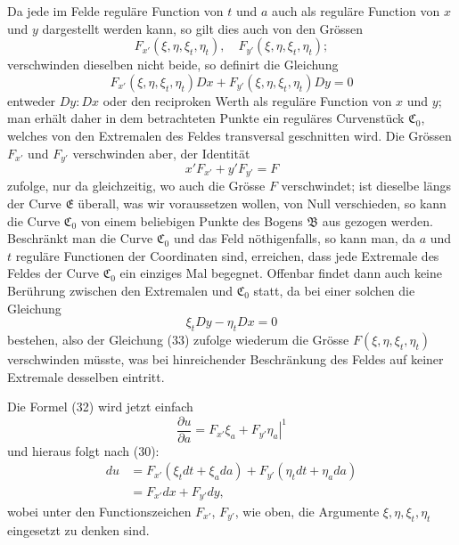 \documentclass[11pt,a4paper,leqno]{article}
\begin{document}
Da jede im Felde reguläre Function von $t$ und $a$ auch als reguläre Function von $x$ und $y$ dargestellt werden kann, so gilt dies auch von den Grössen
\[
F_{x'}(\xi,\eta,\xi_t,\eta_t),\quad F_{y'}(\xi,\eta,\xi_t,\eta_t);
\]
verschwinden dieselben nicht beide, so definirt die Gleichung
\begin{equation}\tag{33}
F_{x'}(\xi,\eta,\xi_t,\eta_t)Dx+F_{y'}(\xi,\eta,\xi_t,\eta_t)Dy=0
\end{equation}
entweder $Dy:Dx$ oder den reciproken Werth als reguläre Function von $x$ und $y$; man erhält daher in dem betrachteten Punkte ein reguläres Curvenstück $\mathfrak{C}_0$, welches von den Extremalen des Feldes transversal geschnitten wird. Die Grössen $F_{x'}$ und $F_{y'}$ verschwinden aber, der Identität
\[
x'F_{x'}+y'F_{y'}=F
\]
zufolge, nur da gleichzeitig, wo auch die Grösse $F$ verschwindet; ist dieselbe längs der Curve $\mathfrak{E}$ überall, was wir voraussetzen wollen, von Null verschieden, so kann die Curve $\mathfrak{C}_0$ von einem beliebigen Punkte des Bogens $\mathfrak{B}$ aus gezogen werden. Beschränkt man die Curve $\mathfrak{C}_0$ und das Feld nöthigenfalls, so kann man, da $a$ und $t$ reguläre Functionen der Coordinaten sind, erreichen, dass jede Extremale des Feldes der Curve $\mathfrak{C}_0$ ein einziges Mal begegnet. Offenbar findet dann auch keine Berührung zwischen den Extremalen und $\mathfrak{C}_0$ statt, da bei einer solchen die Gleichung
\[
\xi_tDy-\eta_tDx=0
\]
bestehen, also der Gleichung (33) zufolge wiederum die Grösse $F(\xi,\eta,\xi_t,\eta_t)$ verschwinden müsste, was bei hinreichender Beschränkung des Feldes auf keiner Extremale desselben eintritt.

Die Formel (32) wird jetzt einfach
\[
\frac{\partial u}{\partial a}=\left.F_{x'}\xi_a+F_{y'}\eta_a\right|^1
\]
und hieraus folgt nach (30):
\begin{equation}\tag{34}
\begin{split}
du&=F_{x'}(\xi_tdt+\xi_a da)+F_{y'}(\eta_tdt+\eta_a da)\\
&=F_{x'}dx+F_{y'}dy,
\end{split}
\end{equation}
wobei unter den Functionszeichen $F_{x'}$, $F_{y'}$, wie oben, die Argumente $\xi,\eta,\xi_t,\eta_t$ eingesetzt zu denken sind.
\end{document}
